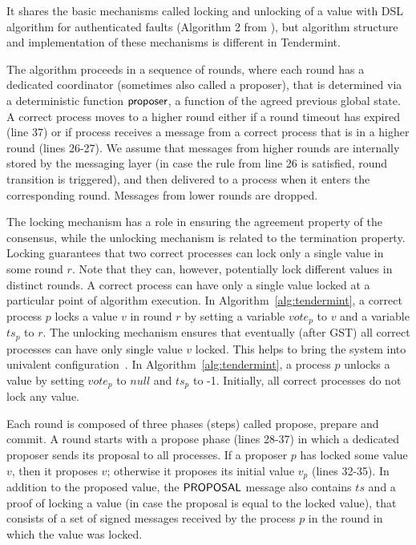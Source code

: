 It shares the basic mechanisms called locking and unlocking of a value with DSL algorithm for authenticated faults (Algorithm 2 from \cite{DLS88:jacm}), but algorithm structure and implementation of these mechanisms is different in Tendermint. 

The algorithm proceeds in a sequence of rounds, where each round has a dedicated coordinator (sometimes also called a proposer), that is determined via a deterministic function $\mathsf{proposer}$, a function of the agreed previous global state. A correct process moves to a higher round either if a round timeout has expired (line 37) or if process receives a message from a correct process that is in a higher round (lines 26-27). We assume that messages from higher rounds are internally stored by the messaging layer (in case the rule from line 26 is satisfied, round transition is triggered), and then delivered to a process when it enters the corresponding round. Messages from lower rounds are dropped.

The locking mechanism has a role in ensuring the agreement property of the consensus, while the unlocking mechanism is related to the termination property. Locking guarantees that two correct processes can lock only a single value in some round $r$. Note that they can, however, potentially lock different values in distinct rounds. A correct process can have only a single value locked at a particular point of algorithm execution. In Algorithm~\ref{alg:tendermint}, a correct process $p$ locks a value $v$ in round $r$ by setting a variable $vote_p$ to $v$ and a variable $ts_p$ to $r$. The unlocking mechanism ensures that eventually (after GST) all correct processes can have only single value $v$ locked. This helps to bring the system into univalent configuration~\cite{FLP85:jacm}. In Algorithm~\ref{alg:tendermint}, a process $p$ unlocks a value by setting $vote_p$ to $null$ and $ts_p$ to -1. Initially, all correct processes do not lock any value.

Each round is composed of three phases (steps) called propose, prepare and commit. A round starts with a propose phase (lines 28-37) in which a dedicated proposer sends its proposal to all processes. If a proposer $p$ has locked some value $v$, then it proposes $v$; otherwise it proposes its initial value $v_p$ (lines 32-35). In addition to the proposed value, the $\mathsf{PROPOSAL}$ message also contains $ts$ and a proof of locking a value (in case the proposal is equal to the locked value), that consists of a set of signed messages received by the process $p$ in the round in which the value was locked. 

